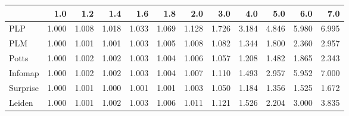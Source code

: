 \begin{tabular}{lrrrrrrrrrrr}
\toprule
{} &   1.0 &   1.2 &   1.4 &   1.6 &   1.8 &   2.0 &   3.0 &   4.0 &   5.0 &   6.0 &   7.0 \\
\midrule
PLP      & 1.000 & 1.008 & 1.018 & 1.033 & 1.069 & 1.128 & 1.726 & 3.184 & 4.846 & 5.980 & 6.995 \\
PLM      & 1.000 & 1.001 & 1.001 & 1.003 & 1.005 & 1.008 & 1.082 & 1.344 & 1.800 & 2.360 & 2.957 \\
Potts    & 1.000 & 1.002 & 1.002 & 1.003 & 1.004 & 1.006 & 1.057 & 1.208 & 1.482 & 1.865 & 2.343 \\
Infomap  & 1.000 & 1.002 & 1.002 & 1.003 & 1.004 & 1.007 & 1.110 & 1.493 & 2.957 & 5.952 & 7.000 \\
Surprise & 1.000 & 1.001 & 1.000 & 1.001 & 1.001 & 1.003 & 1.050 & 1.184 & 1.356 & 1.525 & 1.672 \\
Leiden   & 1.000 & 1.001 & 1.002 & 1.003 & 1.006 & 1.011 & 1.121 & 1.526 & 2.204 & 3.000 & 3.835 \\
\bottomrule
\end{tabular}
